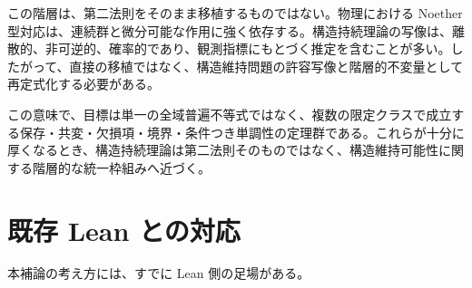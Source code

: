 \documentclass[12pt,a4paper]{article}
\begin{document}
この階層は、第二法則をそのまま移植するものではない。物理における Noether 型対応は、連続群と微分可能な作用に強く依存する。構造持続理論の写像は、離散的、非可逆的、確率的であり、観測指標にもとづく推定を含むことが多い。したがって、直接の移植ではなく、構造維持問題の許容写像と階層的不変量として再定式化する必要がある。

この意味で、目標は単一の全域普遍不等式ではなく、複数の限定クラスで成立する保存・共変・欠損項・境界・条件つき単調性の定理群である。これらが十分に厚くなるとき、構造持続理論は第二法則そのものではなく、構造維持可能性に関する階層的な統一枠組みへ近づく。

\section{既存 Lean との対応}\label{ux65e2ux5b58-lean-ux3068ux306eux5bfeux5fdc}

本補論の考え方には、すでに Lean 側の足場がある。
\end{document}
